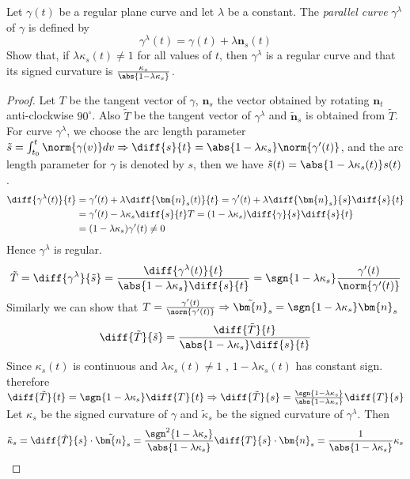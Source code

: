 \begin{problem}
Let $\gamma(t)$ be a regular plane curve and let $\lambda$ be a constant. The \textit{parallel curve} $\gamma^{\lambda}$ of $\gamma$ is defined by
\begin{equation}
\gamma^{\lambda}(t) = \gamma(t) + \lambda \bm{n}_s (t)
\end{equation}
Show that, if $\lambda \kappa_s(t) \neq 1 $ for all values of $t$, then $\gamma^{\lambda}$ is a regular curve and that its signed curvature is 
$\frac{\kappa_s}{\abs{1-\lambda \kappa_s}}$.
\end{problem}
\begin{solution}
    \begin{proof}
    Let $T$ be the tangent vector of $\gamma$, $\bm{n}_s$ the vector obtained by rotating $\bm{n}_t$ anti-clockwise $90^\circ$.
    Also $\tilde{T}$ be the tangent vector of $\gamma^{\lambda}$ and $\tilde{\bm{n}}_s$ is obtained from $\tilde{T}$. For curve $\gamma^{\lambda}$, we choose the arc length parameter $\tilde{s} =\int_{t_0}^t \norm{\gamma(v)}dv \Rightarrow \diff{s}{t}=\abs{1-\lambda\kappa_s}\norm{\gamma'(t)}$, and the arc length parameter for $\gamma$ is denoted by $s$, then we have $\tilde{s}(t)=\abs{1-\lambda\kappa_s(t)}s(t)$.
    \begin{align*}
    \diff{\gamma^{\lambda}(t)}{t} & = \gamma'(t) +\lambda \diff{\bm{n}_s (t)}{t}  =   \gamma'(t) + \lambda \diff{\bm{n}_s}{s}\diff{s}{t}\\
    & =\gamma'(t) - \lambda \kappa_s \diff{s}{t} T = (1-\lambda \kappa_s)\diff{\gamma}{s} \diff{s}{t}\\
    & = (1-\lambda\kappa_s)\gamma'(t) \neq 0
    \end{align*}
    Hence $\gamma^{\lambda}$ is regular.
    $$
    \tilde{T}=\diff{\gamma^{\lambda}}{\tilde{s}}=\frac{\diff{\gamma^{\lambda}(t)}{t}}{\abs{1-\lambda \kappa_s}\diff{s}{t}}=\sgn\{1-\lambda\kappa_s\}\frac{\gamma'(t)}{\norm{\gamma'(t)}}
    $$
    Similarly we can show that $T=\frac{\gamma'(t)}{\norm{\gamma'(t)}}\Rightarrow \tilde{\bm{n}}_s=\sgn\{1-\lambda \kappa_s\}\bm{n}_s$
    $$
    \diff{\tilde{T}}{\tilde{s}}=\frac{\diff{\tilde{T}}{t}}{\abs{1-\lambda \kappa_s}\diff{s}{t}}
    $$
    Since $\kappa_s(t)$ is continuous and $\lambda \kappa_s(t)\neq 1$ , $1-\lambda \kappa_s(t)$ has constant sign. therefore 
    $\diff{\tilde{T}}{t} =\sgn\{1-\lambda\kappa_s\} \diff{T}{t} \Rightarrow \diff{\tilde{T}}{s} =\frac{\sgn\{1-\lambda\kappa_s\}}{\abs{1-\lambda\kappa_s}}\diff{T}{s}$
    Let $\kappa_s$ be the signed curvature of $\gamma$ and $\tilde{\kappa}_s$ be the signed curvature of $\gamma^{\lambda}$.
    Then
    $$
    \tilde{\kappa}_s = \diff{\tilde{T}}{s}\cdot \tilde{\bm{n}}_s =\frac{\sgn^2\{1-\lambda\kappa_s\}}{\abs{1-\lambda\kappa_s}}\diff{T}{s} \cdot \bm{n}_s
    = \frac{1}{\abs{1-\lambda\kappa_s}}\kappa_s
    $$
    
    \end{proof}
\end{solution}
    
